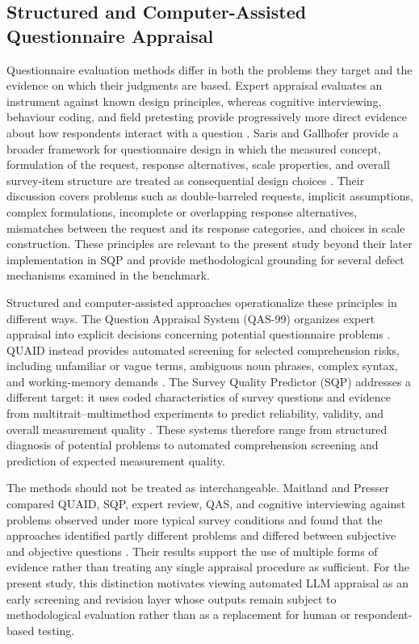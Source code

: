 \documentclass[11pt,a4paper]{article}
\begin{document}
\subsection{Structured and Computer-Assisted Questionnaire Appraisal}
\label{subsec:structured-appraisal}

Questionnaire evaluation methods differ in both the problems they target and the
evidence on which their judgments are based. Expert appraisal evaluates an
instrument against known design principles, whereas cognitive interviewing,
behaviour coding, and field pretesting provide progressively more direct evidence
about how respondents interact with a question
\cite{presser2004methods}. Saris and Gallhofer provide a broader framework for
questionnaire design in which the measured concept, formulation of the request,
response alternatives, scale properties, and overall survey-item structure are
treated as consequential design choices \cite{saris2014design}. Their discussion
covers problems such as double-barreled requests, implicit assumptions, complex
formulations, incomplete or overlapping response alternatives, mismatches between
the request and its response categories, and choices in scale construction. These
principles are relevant to the present study beyond their later implementation in
SQP and provide methodological grounding for several defect mechanisms examined
in the benchmark.

Structured and computer-assisted approaches operationalize these principles in
different ways. The Question Appraisal System (QAS-99) organizes expert appraisal
into explicit decisions concerning potential questionnaire problems
\cite{willis1999qas}. QUAID instead provides automated screening for selected
comprehension risks, including unfamiliar or vague terms, ambiguous noun phrases,
complex syntax, and working-memory demands \cite{graesser2006quaid}. The Survey
Quality Predictor (SQP) addresses a different target: it uses coded characteristics
of survey questions and evidence from multitrait--multimethod experiments to
predict reliability, validity, and overall measurement quality
\cite{saris2014design}. These systems therefore range from structured diagnosis of
potential problems to automated comprehension screening and prediction of expected
measurement quality.

The methods should not be treated as interchangeable. Maitland and Presser compared
QUAID, SQP, expert review, QAS, and cognitive interviewing against problems observed
under more typical survey conditions and found that the approaches identified
partly different problems and differed between subjective and objective questions
\cite{maitland2018question}. Their results support the use of multiple forms of
evidence rather than treating any single appraisal procedure as sufficient. For the
present study, this distinction motivates viewing automated LLM appraisal as an
early screening and revision layer whose outputs remain subject to methodological
evaluation rather than as a replacement for human or respondent-based testing.
\end{document}
